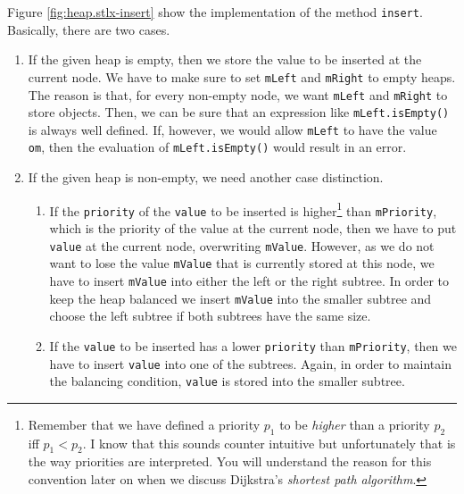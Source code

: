 \noindent
Figure \ref{fig:heap.stlx-insert} show the implementation of the method \texttt{insert}.
Basically, there are two cases.
\begin{enumerate}
\item If the given heap is empty, then we store the value to be inserted at the current node.
      We have to make sure to set \texttt{mLeft} and \texttt{mRight} to empty heaps.  The reason is
      that, for every non-empty node, we want \texttt{mLeft} and \texttt{mRight} to store objects.
      Then, we can be sure that an expression like \texttt{mLeft.isEmpty()} is always well defined.
      If, however, we would allow \texttt{mLeft} to have the value \texttt{om}, then the evaluation
      of \texttt{mLeft.isEmpty()} would result in an error.
\item If the given heap is non-empty, we need another case distinction.
  \begin{enumerate}
  \item If the \texttt{priority} of the \texttt{value} to be inserted is higher\footnote{
        Remember that we have defined a priority $p_1$ to be \emph{higher} than a priority $p_2$
        iff $p_1 < p_2$.  I know that this sounds counter intuitive but unfortunately that is the
        way priorities are interpreted.  You will understand the reason for this convention later on
        when we discuss Dijkstra's \emph{shortest path algorithm}.}
        than
        \texttt{mPriority}, which is the priority of the value at the current node, then we have to 
        put \texttt{value} at the current node, overwriting \texttt{mValue}.  However, as we do not want
        to lose the value \texttt{mValue} that is currently stored at this node, we have to insert 
        \texttt{mValue} into either the left or the right subtree.  In order to keep the heap
        balanced we insert \texttt{mValue} into the smaller subtree and choose the left subtree if
        both subtrees have the same size.
  \item If the \texttt{value} to be inserted has a lower \texttt{priority} than \texttt{mPriority}, then we have
        to insert \texttt{value} into one of the subtrees.  Again, in order to maintain the balancing
        condition, \texttt{value} is stored into the smaller subtree.
  \end{enumerate}
\end{enumerate}

